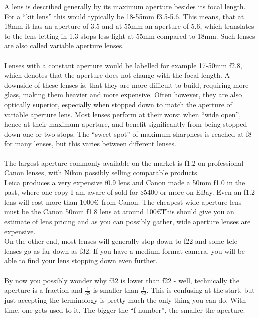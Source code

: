 A lens is described generally by its maximum aperture besides its focal length. For a ``kit lens'' this would typically be 18-55mm f3.5-5.6. This means, that at 18mm it has an \gls{aperture} of 3.5 and at 55mm an \gls{aperture} of 5.6, which translates to the lens letting in 1.3 \glspl{stop} less light at 55mm compared to 18mm. Such lenses are also called variable \gls{aperture} lenses.
\\
\\
Lenses with a constant \gls{aperture} would be labelled for example 17-50mm f2.8, which denotes that the \gls{aperture} does not change with the focal length. A downside of these lenses is, that they are more difficult to build, requiring more glass, making them heavier and more expensive. Often however, they are also optically superior, especially when stopped down to match the \gls{aperture} of variable aperture lens. Most lenses perform at their worst when ``wide open'', hence at their maximum aperture, and benefit significantly from being stopped down one or two \glspl{stop}. The ``sweet spot'' of maximum sharpness is reached at f8 for many lenses, but this varies between different lenses.
\\
\\
The largest \gls{aperture} commonly available on the market is f1.2 on professional Canon lenses, with Nikon possibly selling comparable products.
\\
Leica produces a very expensive f0.9 lens and Canon made a 50mm f1.0 in the past, where one copy I am aware of sold for \$5400 or more on EBay. Even an f1.2 lens will cost more than 1000\euro\ from Canon. The cheapest wide \gls{aperture} lens must be the Canon 50mm f1.8 lens at around 100\euro\. This should give you an estimate of lens pricing and as you can possibly gather, wide \gls{aperture} lenses are expensive.
\\
On the other end, most lenses will generally stop down to f22 and some tele lenses go as far down as f32. If you have a medium format camera, you will be able to find your lens stopping down even further.
\\
\\
By now you possibly wonder why f32 is lower than f22 - well, technically the \gls{aperture} is a fraction and $\frac{1}{32}$ is smaller than $\frac{1}{22}$. This is confusing at the start, but just accepting the terminology is pretty much the only thing you can do. With time, one gets used to it. The bigger the ``f-number'', the smaller the \gls{aperture}.


